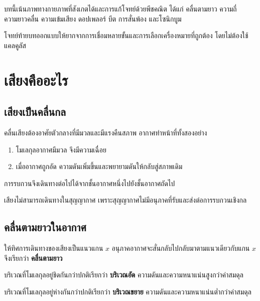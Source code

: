 \begin{tcolorbox}[title={ขอบเขตของบทนี้}]
บทนี้เน้นภาพทางกายภาพที่สังเกตได้และการแก้โจทย์ด้วยพีชคณิต ได้แก่ คลื่นตามยาว ความถี่ ความยาวคลื่น ความเข้มเสียง ดอปเพลอร์ บีต การสั่นพ้อง และโซนิกบูม

โจทย์ท้ายบทออกแบบให้ยากจากการเชื่อมหลายขั้นและการเลือกเครื่องหมายที่ถูกต้อง โดยไม่ต้องใช้แคลคูลัส
\end{tcolorbox}

\section{เสียงคืออะไร}

\subsection{เสียงเป็นคลื่นกล}

คลื่นเสียงต้องอาศัยตัวกลางที่มีมวลและมีแรงคืนสภาพ อากาศทำหน้าที่ทั้งสองอย่าง

\begin{enumerate}
    \item โมเลกุลอากาศมีมวล จึงมีความเฉื่อย
    \item เมื่ออากาศถูกอัด ความดันเพิ่มขึ้นและพยายามดันให้กลับสู่สภาพเดิม
\end{enumerate}

การรบกวนจึงเดินทางต่อไปได้จากชั้นอากาศหนึ่งไปยังชั้นอากาศถัดไป

\begin{tcolorbox}[title={ข้อสรุปสำคัญ}]
เสียงไม่สามารถเดินทางในสุญญากาศ เพราะสุญญากาศไม่มีอนุภาคที่รับและส่งต่อการรบกวนเชิงกล
\end{tcolorbox}

\subsection{คลื่นตามยาวในอากาศ}

ให้ทิศการเดินทางของเสียงเป็นแนวแกน $x$ อนุภาคอากาศจะสั่นกลับไปกลับมาตามแนวเดียวกับแกน $x$ จึงเรียกว่า \textbf{คลื่นตามยาว}

บริเวณที่โมเลกุลอยู่ชิดกันกว่าปกติเรียกว่า \textbf{บริเวณอัด} ความดันและความหนาแน่นสูงกว่าค่าสมดุล

บริเวณที่โมเลกุลอยู่ห่างกันกว่าปกติเรียกว่า \textbf{บริเวณขยาย} ความดันและความหนาแน่นต่ำกว่าค่าสมดุล

